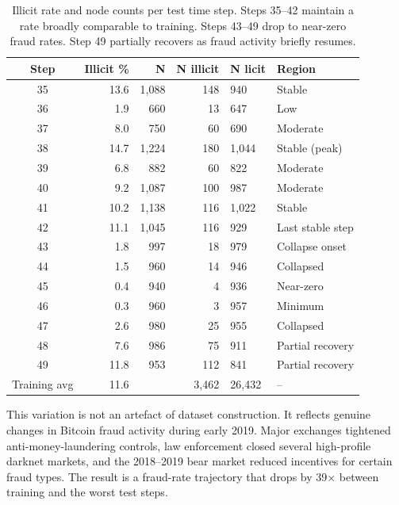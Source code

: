 \begin{table}[!htbp]
\centering
\caption{Illicit rate and node counts per test time step.  Steps 35--42
maintain a rate broadly comparable to training.  Steps 43--49 drop to
near-zero fraud rates.  Step 49 partially recovers as fraud activity
briefly resumes.}
\label{tab:temporal_rates}
\small
\begin{tabular}{crrrll}
\toprule
\textbf{Step} & \textbf{Illicit \%} & \textbf{N}
  & \textbf{N illicit} & \textbf{N licit} & \textbf{Region} \\
\midrule
35 & 13.6 & 1,088 & 148 & 940  & Stable \\
36 &  1.9 &   660 &  13 & 647  & Low \\
37 &  8.0 &   750 &  60 & 690  & Moderate \\
38 & 14.7 & 1,224 & 180 & 1,044 & Stable (peak) \\
39 &  6.8 &   882 &  60 & 822  & Moderate \\
40 &  9.2 & 1,087 & 100 & 987  & Moderate \\
41 & 10.2 & 1,138 & 116 & 1,022 & Stable \\
42 & 11.1 & 1,045 & 116 & 929  & Last stable step \\
\midrule
43 &  1.8 &   997 &  18 & 979  & Collapse onset \\
44 &  1.5 &   960 &  14 & 946  & Collapsed \\
45 &  0.4 &   940 &   4 & 936  & Near-zero \\
46 &  0.3 &   960 &   3 & 957  & Minimum \\
47 &  2.6 &   980 &  25 & 955  & Collapsed \\
48 &  7.6 &   986 &  75 & 911  & Partial recovery \\
49 & 11.8 &   953 & 112 & 841  & Partial recovery \\
\midrule
Training avg & 11.6 & & 3,462 & 26,432 & -- \\
\bottomrule
\end{tabular}
\end{table}

This variation is not an artefact of dataset construction.  It reflects
genuine changes in Bitcoin fraud activity during early 2019.  Major
exchanges tightened anti-money-laundering controls, law enforcement
closed several high-profile darknet markets, and the 2018--2019 bear
market reduced incentives for certain fraud types.  The result is a
fraud-rate trajectory that drops by 39$\times$ between training and
the worst test steps.

